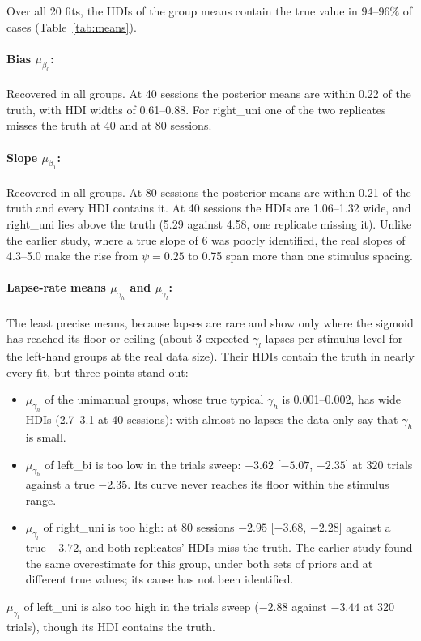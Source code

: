 \documentclass[11pt]{article}
\begin{document}
Over all 20 fits, the HDIs of the group means contain the true value in 94--96\% of
cases (Table~\ref{tab:means}).

\paragraph{Bias $\mu_{\beta_0}$:} Recovered in all groups. At 40 sessions the posterior
means are within 0.22 of the truth, with HDI widths of 0.61--0.88. For right\_uni one
of the two replicates misses the truth at 40 and at 80 sessions.

\paragraph{Slope $\mu_{\beta_1}$:} Recovered in all groups. At 80 sessions the posterior
means are within 0.21 of the truth and every HDI contains it. At 40 sessions the HDIs
are 1.06--1.32 wide, and right\_uni lies above the truth (5.29 against 4.58, one
replicate missing it). Unlike the earlier study, where a true slope of 6 was poorly
identified, the real slopes of 4.3--5.0 make the rise from $\psi = 0.25$ to 0.75 span
more than one stimulus spacing.

\paragraph{Lapse-rate means $\mu_{\gamma_h}$ and $\mu_{\gamma_l}$:} The least precise
means, because lapses are rare and show only where the sigmoid has reached its floor
or ceiling (about 3 expected $\gamma_l$ lapses per stimulus level for the left-hand
groups at the real data size). Their HDIs contain the truth in nearly every fit, but
three points stand out:
\begin{itemize}
  \item $\mu_{\gamma_h}$ of the unimanual groups, whose true typical $\gamma_h$ is
        0.001--0.002, has wide HDIs (2.7--3.1 at 40 sessions): with almost no lapses the data
        only say that $\gamma_h$ is small.
  \item $\mu_{\gamma_h}$ of left\_bi is too low in the trials sweep: $-3.62$
        [$-5.07$, $-2.35$] at 320 trials against a true $-2.35$. Its curve never
        reaches its floor within the stimulus range.
  \item $\mu_{\gamma_l}$ of right\_uni is too high: at 80 sessions $-2.95$
        [$-3.68$, $-2.28$] against a true $-3.72$, and both replicates' HDIs miss the
        truth. The earlier study found the same overestimate for this group, under
        both sets of priors and at different true values; its cause has not been
        identified.
\end{itemize}
$\mu_{\gamma_l}$ of left\_uni is also too high in the trials sweep ($-2.88$ against
$-3.44$ at 320 trials), though its HDI contains the truth.
\end{document}
